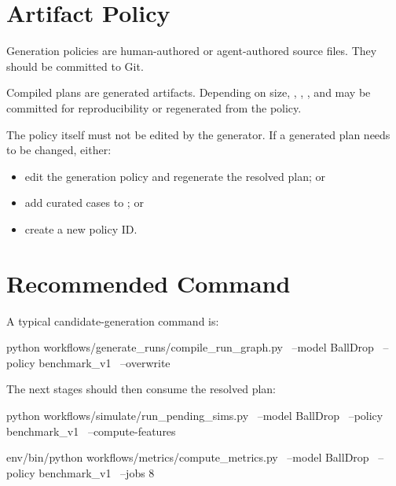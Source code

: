 \documentclass[11pt]{article}
\begin{document}
\section*{Artifact Policy}

Generation policies are human-authored or agent-authored source files.
They should be committed to Git.

Compiled plans are generated artifacts.
Depending on size, , , , and  may be committed for reproducibility or regenerated from the policy.

The policy itself must not be edited by the generator.
If a generated plan needs to be changed, either:

\begin{itemize}
    \item edit the generation policy and regenerate the resolved plan; or
    \item add curated cases to ; or
    \item create a new policy ID.
\end{itemize}

\section*{Recommended Command}

A typical candidate-generation command is:

\begin{DocCode}
python workflows/generate_runs/compile_run_graph.py \
  --model BallDrop \
  --policy benchmark_v1 \
  --overwrite
\end{DocCode}

The next stages should then consume the resolved plan:

\begin{DocCode}
python workflows/simulate/run_pending_sims.py \
  --model BallDrop \
  --policy benchmark_v1 \
  --compute-features

env/bin/python workflows/metrics/compute_metrics.py \
  --model BallDrop \
  --policy benchmark_v1 \
  --jobs 8
\end{DocCode}
\end{document}
